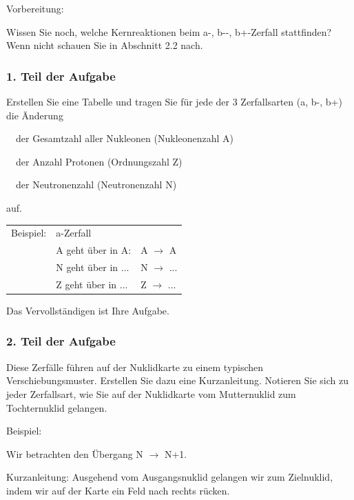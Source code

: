 \documentclass[12pt,a4paper,twoside]{article}
\begin{document}
Vorbereitung:

Wissen Sie noch, welche Kernreaktionen beim \textgreek{a}\nobreakdash-, \textgreek{b}\nobreakdash-\nobreakdash-, \textgreek{b}+\nobreakdash-Zerfall stattfinden? Wenn nicht schauen Sie in Abschnitt 2.2 nach.

\subsubsection*{1. Teil der Aufgabe}
Erstellen Sie eine Tabelle und tragen Sie für jede der 3 Zerfallsarten (\textgreek{a}, \textgreek{b}\nobreakdash-, \textgreek{b}+) die Änderung

{\textbullet}\ \ der Gesamtzahl aller Nukleonen (Nukleonenzahl A)

{\textbullet}\ \ der Anzahl Protonen (Ordnungszahl Z)

{\textbullet}\ \ der Neutronenzahl (Neutronenzahl N)

auf.

\begin{flushleft}
\tablefirsthead{}
\tablehead{}
\tabletail{}
\tablelasttail{}
\begin{supertabular}{m{2.3009999cm}m{4.801cm}m{4.801cm}}
Beispiel: &
\textgreek{a}{}-Zerfall &
~
\\
~
 &
A geht über in A: &
A ${\rightarrow}$ A\\
~
 &
N geht über in ... &
N ${\rightarrow}$ ...\\
~
 &
Z geht über in ... &
Z ${\rightarrow}$ ...\\
\end{supertabular}
\end{flushleft}
Das Vervollständigen ist Ihre Aufgabe.

\subsubsection*{2. Teil der Aufgabe}
Diese Zerfälle führen auf der Nuklidkarte zu einem typischen Verschiebungsmuster. Erstellen Sie dazu eine {\quotedblbase}Kurzanleitung{\quotedblbase}. Notieren Sie sich zu jeder Zerfallsart, wie Sie auf der Nuklidkarte vom Mutternuklid zum Tochternuklid gelangen.

Beispiel:

Wir betrachten den Übergang N ${\rightarrow}$ N+1.

Kurzanleitung: Ausgehend vom Ausgangsnuklid gelangen wir zum Zielnuklid, indem wir auf der Karte ein Feld nach rechts rücken.
\end{document}

